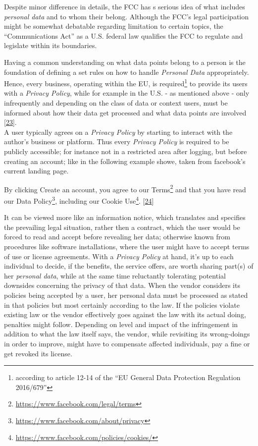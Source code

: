 \documentclass[12pt,english,a4paper,titlepage,cleardoublepage=empty,dottedtoc]{report}
\renewcommand{\href}[2]{#2\footnote{\url{#1}}}
\let\origquote\quote
\let\endorigquote\endquote
\renewenvironment{quote}{%
    \origquote
    \itshape
}
{\endorigquote}
\begin{document}
Despite minor difference in details, the FCC has s serious idea of what
includes \emph{personal data} and to whom their belong. Although the
FCC's legal participation might be somewhat debatable regarding
limitation to certain topics, the ``Communications Act'' as a U.S.
federal law qualifies the FCC to regulate and legislate within its
boundaries.

Having a common understanding on what data points belong to a person is
the foundation of defining a set rules on how to handle \emph{Personal
Data} appropriately. Hence, every business, operating within the EU, is
required\footnote{according to article 12-14 of the ``EU General Data
  Protection Regulation 2016/679''} to provide its users with a
\emph{Privacy Policy}, while for example in the U.S. - as mentioned
above - only infrequently and depending on the class of data or context
users, must be informed about how their data get processed and what data
points are involved
{[}\protect\hyperlink{ref-web_2016_privacy-policies-are-mandatory-by-law}{23}{]}.\\
A user typically agrees on a \emph{Privacy Policy} by starting to
interact with the author's business or platform. Thus every
\emph{Privacy Policy} is required to be publicly accessible; for
instance not in a restricted area after logging, but before creating an
account; like in the following example showe, taken from facebook's
current landing page.

\begin{quote}
By clicking Create an account, you agree to our
\href{https://www.facebook.com/legal/terms}{Terms} and that you have
read our \href{https://www.facebook.com/about/privacy}{Data Policy},
including our \href{https://www.facebook.com/policies/cookies/}{Cookie
Use}.
{[}\protect\hyperlink{ref-web_2016_facebooks-landing-page_policy-acknowledgement}{24}{]}
\end{quote}

It can be viewed more like an information notice, which translates and
specifies the prevailing legal situation, rather then a contract, which
the user would be forced to read and accept before revealing her data;
otherwise known from procedures like software installations, where the
user might have to accept terms of use or license agreements. With a
\emph{Privacy Policy} at hand, it's up to each individual to decide, if
the benefits, the service offers, are worth sharing part(s) of her
\emph{personal data}, while at the same time reluctantly tolerating
potential downsides concerning the privacy of that data. When the vendor
considers its policies being accepted by a user, her personal data must
be processed as stated in that policies but most certainly according to
the law. If the policies violate existing law or the vendor effectively
goes against the law with its actual doing, penalties might follow.
Depending on level and impact of the infringement in addition to what
the law itself says, the vendor, while revisiting its wrong-doings in
order to improve, might have to compensate affected individuals, pay a
fine or get revoked its license.
\end{document}
